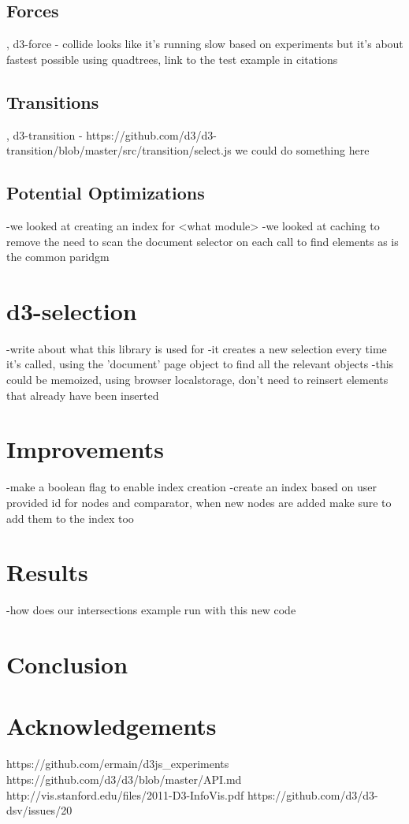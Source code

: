 \documentclass[a4paper]{article}
\begin{document}
\subsection{Forces}, d3-force - collide looks like it's running slow based on experiments but it's about fastest possible using quadtrees, link to the test example in citations

\subsection{Transitions}, d3-transition - https://github.com/d3/d3-transition/blob/master/src/transition/select.js we could do something here

\subsection{Potential Optimizations}
-we looked at creating an index for <what module>
-we looked at caching to remove the need to scan the document selector on each call to find elements as is the common paridgm
\section{d3-selection}
-write about what this library is used for
-it creates a new selection every time it's called, using the 'document' page object to find all the relevant objects
-this could be memoized, using browser localstorage, don't need to reinsert elements that already have been inserted
\section{Improvements}
-make a boolean flag to enable index creation
-create an index based on user provided id for nodes and comparator, when new nodes are added make sure to add them to the index too
\section{Results}
-how does our intersections example run with this new code
\section{Conclusion}

\section{Acknowledgements}


\begin{thebibliography}{9}
 https://github.com/ermain/d3js\_experiments
 https://github.com/d3/d3/blob/master/API.md
 http://vis.stanford.edu/files/2011-D3-InfoVis.pdf
 https://github.com/d3/d3-dsv/issues/20
\end{thebibliography}

\end{document}
